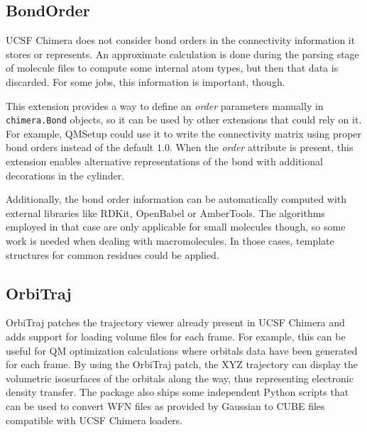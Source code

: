 \subsection{BondOrder}
UCSF Chimera does not consider bond orders in the connectivity information it stores or represents. An approximate calculation is done during the parsing stage of molecule files to compute some internal atom types, but then that data is discarded. For some jobs, this information is important, though.

This extension provides a way to define an \textit{order} parameters manually in \texttt{chimera.Bond} objects, so it can be used by other extensions that could rely on it. For example, QMSetup could use it to write the connectivity matrix using proper bond orders instead of the default $1.0$. When the \textit{order} attribute is present, this extension enables alternative representations of the bond with additional decorations in the cylinder.

Additionally, the bond order information can be automatically computed with external libraries like RDKit,\cite{rdkit} OpenBabel\cite{oboyle2011} or AmberTools.\cite{amber} The algorithms employed in that case are only applicable for small molecules though, so some work is needed when dealing with macromolecules. In those cases, template structures for common residues could be applied.

\subsection{OrbiTraj}
OrbiTraj patches the trajectory viewer already present in UCSF Chimera and adds support for loading volume files for each frame. For example, this can be useful for QM optimization calculations where orbitals data have been generated for each frame. By using the OrbiTraj patch, the XYZ trajectory can display the volumetric isosurfaces of the orbitals along the way, thus representing electronic density transfer. The package also ships some independent Python scripts that can be used to convert WFN files as provided by Gaussian to CUBE files compatible with UCSF Chimera loaders.


